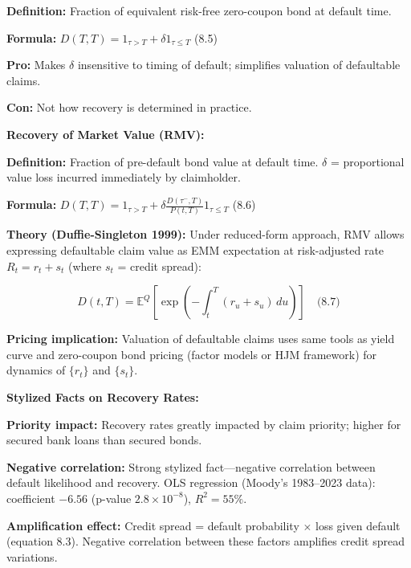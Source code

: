 \documentclass[12pt,a4paper]{article}
\begin{document}
\textbf{Definition:} Fraction of equivalent risk-free zero-coupon bond at default time.

\textbf{Formula:} $D(T,T) = 1_{\tau>T} + \delta 1_{\tau \leq T}$ \quad (8.5)

\textbf{Pro:} Makes $\delta$ insensitive to timing of default; simplifies valuation of defaultable claims.

\textbf{Con:} Not how recovery is determined in practice.

\vspace{0.3em}
\noindent\textbf{Recovery of Market Value (RMV):}

\textbf{Definition:} Fraction of pre-default bond value at default time. $\delta$ = proportional value loss incurred immediately by claimholder.

\textbf{Formula:} $D(T,T) = 1_{\tau>T} + \delta \frac{D(\tau^-, T)}{P(t,T)} 1_{\tau \leq T}$ \quad (8.6)

\textbf{Theory (Duffie-Singleton 1999):} Under reduced-form approach, RMV allows expressing defaultable claim value as EMM expectation at risk-adjusted rate $R_t = r_t + s_t$ (where $s_t$ = credit spread):

$$D(t,T) = \mathbb{E}^Q\left[\exp\left(-\int_t^T (r_u + s_u)\,du\right)\right] \quad \text{(8.7)}$$

\textbf{Pricing implication:} Valuation of defaultable claims uses same tools as yield curve and zero-coupon bond pricing (factor models or HJM framework) for dynamics of $\{r_t\}$ and $\{s_t\}$.

\vspace{0.3em}
\noindent\textbf{Stylized Facts on Recovery Rates:}

\textbf{Priority impact:} Recovery rates greatly impacted by claim priority; higher for secured bank loans than secured bonds.

\textbf{Negative correlation:} Strong stylized fact—negative correlation between default likelihood and recovery. OLS regression (Moody's 1983–2023 data): coefficient $-6.56$ (p-value $2.8 \times 10^{-8}$), $R^2 = 55\%$.

\textbf{Amplification effect:} Credit spread = default probability $\times$ loss given default (equation 8.3). Negative correlation between these factors amplifies credit spread variations.
\end{document}
